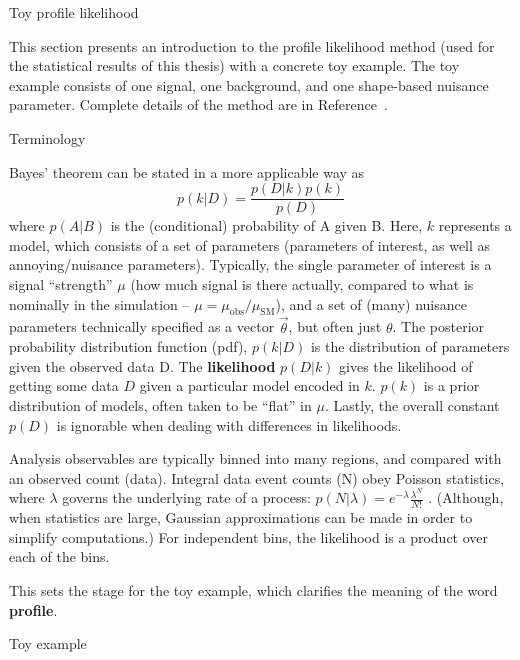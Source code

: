 
\begin{section}{Toy profile likelihood}


This section presents an introduction to the profile likelihood method
(used for the statistical results of this thesis) with a concrete toy example.
The toy example consists of one signal, one background, and one shape-based
nuisance parameter. Complete details of the method are in Reference~\cite{STAT:Cowan2010js}.


\begin{subsection}{Terminology}

Bayes' theorem can be stated in a more applicable way as
\begin{equation}
p(k|D) = \frac{p(D|k)p(k)}{p(D)}
\end{equation}
where $p(A|B)$ is the (conditional) probability of A given B.
Here, $k$ represents a model, which consists of a set of parameters 
(parameters of interest, as well as annoying/nuisance parameters). 
Typically, the single parameter of interest is a signal ``strength'' $\mu$
    (how much signal is there actually, compared to what is nominally in the simulation -- $\mu = \mu_\mathrm{obs}/\mu_\mathrm{SM}$), 
 and a set of (many) nuisance parameters technically specified
as a vector $\vec{\theta}$, but often just $\theta$. The posterior probability 
distribution function (pdf), $p(k|D)$ is the distribution of parameters given the observed
data D. The \textbf{likelihood} $p(D|k)$ gives the likelihood of getting some data $D$
given a particular model encoded in $k$. $p(k)$ is a prior distribution of models, often
taken to be ``flat'' in $\mu$. Lastly, the overall constant $p(D)$ is ignorable when dealing
with differences in likelihoods.

Analysis observables are typically binned into many regions, and compared with an observed count (data).
Integral data event counts (N) obey Poisson statistics, where $\lambda$ governs the underlying
rate of a process: $p(N|\lambda) = e^{-\lambda}\frac{\lambda^N}{N!}$ .
(Although, when statistics are large, Gaussian approximations can be made in order to simplify computations.)
For independent bins, the likelihood is a product over each of the bins.

This sets the stage for the toy example, which clarifies the meaning of the word \textbf{profile}.



\end{subsection}

\begin{subsection}{Toy example}


\end{subsection}
\end{section}
